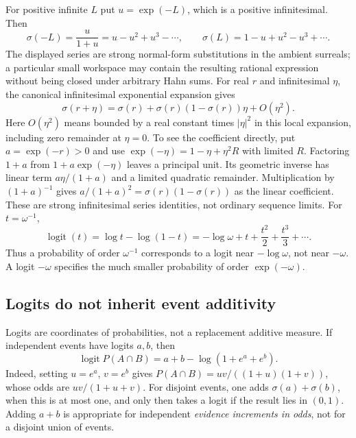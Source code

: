 \documentclass[11pt,a4paper]{article}
\numberwithin{equation}{section}
\theoremstyle{definition}
\theoremstyle{remark}
\newcommand{\logit}{\operatorname{logit}}
\begin{document}
For positive infinite $L$ put $u=\exp(-L)$, which is a positive
infinitesimal. Then
\begin{equation}\label{fsp:eq:logittail}
 \sigma(-L)=\frac{u}{1+u}=u-u^2+u^3-\cdots,\qquad
 \sigma(L)=1-u+u^2-u^3+\cdots.
\end{equation}
The displayed series are strong normal-form substitutions in the ambient
surreals; a particular small workspace may contain the resulting rational
expression without being closed under arbitrary Hahn sums. For real $r$
and infinitesimal $\eta$, the canonical infinitesimal exponential expansion
gives
\begin{equation}
 \sigma(r+\eta)=\sigma(r)+\sigma(r)(1-\sigma(r))\eta+O(\eta^2).
\end{equation}
Here $O(\eta^2)$ means bounded by a real constant times $|\eta|^2$
in this local expansion, including zero remainder at $\eta=0$.
To see the coefficient directly, put $a=\exp(-r)>0$ and use
$\exp(-\eta)=1-\eta+\eta^2R$ with limited $R$. Factoring $1+a$
from $1+a\exp(-\eta)$ leaves a principal unit. Its geometric inverse
has linear term $a\eta/(1+a)$ and a limited quadratic remainder.
Multiplication by $(1+a)^{-1}$ gives $a/(1+a)^2=\sigma(r)(1-\sigma(r))$
as the linear coefficient. These are strong infinitesimal series identities,
not ordinary sequence limits. For $t=\omega^{-1}$,
\begin{equation}\label{fsp:eq:logitt}
 \logit(t)=\log t-\log(1-t)
 =-\log\omega+t+\frac{t^2}{2}+\frac{t^3}{3}+\cdots.
\end{equation}
Thus a probability of order $\omega^{-1}$ corresponds to a logit near
$-\log\omega$, not near $-\omega$. A logit $-\omega$ specifies the much
smaller probability of order $\exp(-\omega)$.

\subsection{Logits do not inherit event additivity}

Logits are coordinates of probabilities, not a replacement additive
measure. If independent events have logits $a,b$, then
\begin{equation}\label{fsp:eq:andlogit}
 \logit P(A\cap B)=a+b-\log(1+e^a+e^b).
\end{equation}
Indeed, setting $u=e^a$, $v=e^b$ gives
$P(A\cap B)=uv/((1+u)(1+v))$, whose odds are $uv/(1+u+v)$.
For disjoint events, one adds $\sigma(a)+\sigma(b)$, when this is at most
one, and only then takes a logit if the result lies in $(0,1)$.
Adding $a+b$ is appropriate for independent \emph{evidence increments in
odds}, not for a disjoint union of events.
\end{document}
